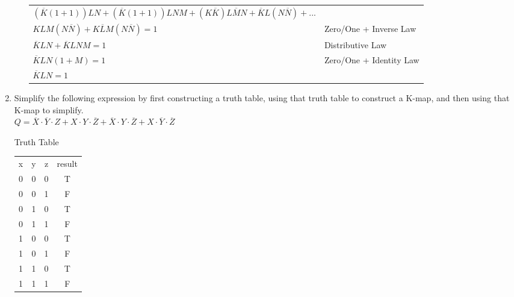 \documentclass{article}
\begin{document}
\begin{enumerate}
\begin{enumerate}
\begin{tabular}{l l}
                $(\overline{K}(1+1))LN + (\overline{K}(1+1))LNM + (K\overline{K})L\overline{M}N + \overline{K}L(N\overline{N}) +$...\\ $KLM(N\overline{N}) + K\overline{L}M(N\overline{N}) = 1$ & Zero/One + Inverse Law\\
                $\overline{K}LN + \overline{K}LNM = 1$ & Distributive Law\\
                $\overline{K}LN(1+M) = 1$ & Zero/One + Identity Law\\
                $\overline{K}LN = 1$
            \end{tabular}
            \begin{center}
            \end{center}
        \end{enumerate}
        \item Simplify the following expression by first constructing a truth table, using that truth table to construct a K-map, and then using that K-map to simplify.\\
        $Q = \overline{X} \cdot \overline{Y} \cdot Z + X \cdot Y \cdot \overline{Z} + \overline{X} \cdot Y \cdot \overline{Z} + X \cdot \overline{Y} \cdot \overline{Z}$\\[0.25in]

        \begin{center}
            Truth Table\\
            \begin{tabular}{c | c | c | c}
                x & y & z & result\\
                0 & 0 & 0 & T\\
                0 & 0 & 1 & F\\
                0 & 1 & 0 & T\\
                0 & 1 & 1 & F\\
                1 & 0 & 0 & T\\
                1 & 0 & 1 & F\\
                1 & 1 & 0 & T\\
                1 & 1 & 1 & F\\
            \end{tabular}\\[0.25in]
        \end{center}
        


\end{enumerate}
\end{document}
